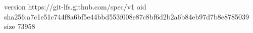 version https://git-lfs.github.com/spec/v1
oid sha256:a7c1e51c744f8a6bf5e44bbd553f008e87c8bf6d2b2a6b84eb97d7b8e8785039
size 73958
